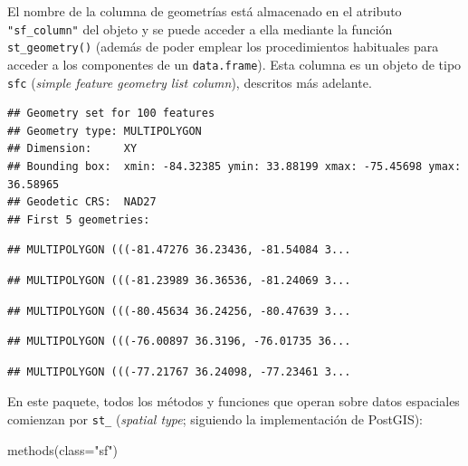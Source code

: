\documentclass[
  spanish,
]{book}
\newenvironment{Shaded}{\begin{snugshade}}{\end{snugshade}}
\newcommand{\AttributeTok}[1]{\textcolor[rgb]{0.77,0.63,0.00}{#1}}
\newcommand{\CommentTok}[1]{\textcolor[rgb]{0.56,0.35,0.01}{\textit{#1}}}
\newcommand{\FunctionTok}[1]{\textcolor[rgb]{0.00,0.00,0.00}{#1}}
\newcommand{\NormalTok}[1]{#1}
\newcommand{\StringTok}[1]{\textcolor[rgb]{0.31,0.60,0.02}{#1}}
\theoremstyle{break}
\theoremstyle{definition}
\theoremstyle{definition}
\theoremstyle{definition}
\theoremstyle{definition}
\theoremstyle{remark}
\begin{document}
El nombre de la columna de geometrías está almacenado en el atributo \texttt{"sf\_column"} del objeto y se puede acceder a ella mediante la función \texttt{st\_geometry()} (además de poder emplear los procedimientos habituales para acceder a los componentes de un \texttt{data.frame}).
Esta columna es un objeto de tipo \texttt{sfc} (\emph{simple feature geometry list column}), descritos más adelante.

\begin{Shaded}
\end{Shaded}

\begin{verbatim}
## Geometry set for 100 features 
## Geometry type: MULTIPOLYGON
## Dimension:     XY
## Bounding box:  xmin: -84.32385 ymin: 33.88199 xmax: -75.45698 ymax: 36.58965
## Geodetic CRS:  NAD27
## First 5 geometries:
\end{verbatim}

\begin{verbatim}
## MULTIPOLYGON (((-81.47276 36.23436, -81.54084 3...
\end{verbatim}

\begin{verbatim}
## MULTIPOLYGON (((-81.23989 36.36536, -81.24069 3...
\end{verbatim}

\begin{verbatim}
## MULTIPOLYGON (((-80.45634 36.24256, -80.47639 3...
\end{verbatim}

\begin{verbatim}
## MULTIPOLYGON (((-76.00897 36.3196, -76.01735 36...
\end{verbatim}

\begin{verbatim}
## MULTIPOLYGON (((-77.21767 36.24098, -77.23461 3...
\end{verbatim}

En este paquete, todos los métodos y funciones que operan sobre datos espaciales comienzan por \texttt{st\_} (\emph{spatial type}; siguiendo la implementación de PostGIS):

\begin{Shaded}
\begin{Highlighting}[]
\FunctionTok{methods}\NormalTok{(}\AttributeTok{class=}\StringTok{"sf"}\NormalTok{)}
\end{Highlighting}
\end{Shaded}
\end{document}
